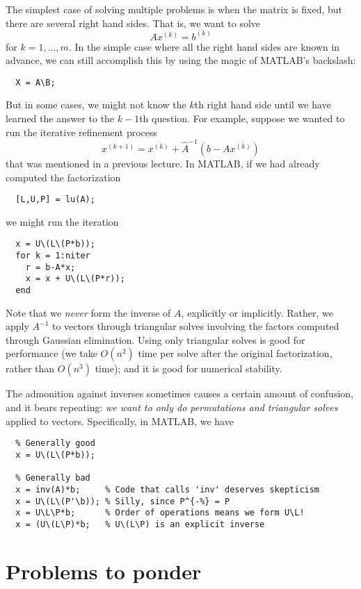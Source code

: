 \documentclass[12pt, leqno]{article}
\begin{document}
The simplest case of solving multiple problems is when the matrix
is fixed, but there are several right hand sides.  That is,
we want to solve
\[
  A x^{(k)} = b^{(k)}
\]
for $k = 1, \ldots, m$.  In the simple case where all the right hand
sides are known in advance, we can still accomplish this by using
the magic of MATLAB's backslash:
\begin{lstlisting}
  X = A\B;
\end{lstlisting}
But in some cases, we might not know the $k$th right hand side until
we have learned the answer to the $k-1$th question.  For example,
suppose we wanted to run the iterative refinement process
\[
  x^{(k+1)} = x^{(k)} + \hat{A}^{-1} (b-Ax^{(k)})
\]
that was mentioned in a previous lecture.  In MATLAB, if we had
already computed the factorization
\begin{lstlisting}
  [L,U,P] = lu(A);
\end{lstlisting}
we might run the iteration
\begin{lstlisting}
  x = U\(L\(P*b));
  for k = 1:niter
    r = b-A*x;
    x = x + U\(L\(P*r));
  end
\end{lstlisting}
Note that we {\em never} form the inverse of $A$, explicitly or implicitly.
Rather, we apply $A^{-1}$ to vectors through triangular solves involving
the factors computed through Gaussian elimination.  Using only
triangular solves is good for performance (we take $O(n^2)$ time per
solve after the original factorization, rather than $O(n^3)$ time);
and it is good for numerical stability.

The admonition against inverses sometimes causes a certain amount of
confusion, and it bears repeating: {\em we want to only do
  permutations and triangular solves} applied to vectors.
Specifically, in MATLAB, we have
\begin{lstlisting}
  % Generally good
  x = U\(L\(P*b));

  % Generally bad
  x = inv(A)*b;     % Code that calls 'inv' deserves skepticism
  x = U\(L\(P'\b)); % Silly, since P^{-%} = P
  x = U\L\P*b;      % Order of operations means we form U\L!
  x = (U\(L\P)*b;   % U\(L\P) is an explicit inverse
\end{lstlisting}

\newpage
\section{Problems to ponder}
\end{document}

